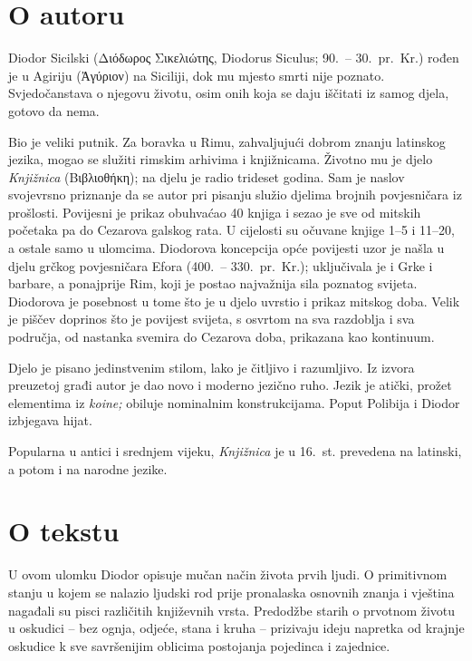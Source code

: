 \section*{O autoru}

Diodor Sicilski \textgreek[variant=ancient]{(Διόδωρος Σικελιώτης,} Diodorus Siculus; 90.\ – 30.\ pr.~Kr.) rođen je u Agiriju \textgreek[variant=ancient]{(Ἀγύριον)} na Siciliji, dok mu mjesto smrti nije poznato. Svjedočanstava o njegovu životu, osim onih koja se daju iščitati iz samog djela, gotovo da nema. 

Bio je veliki putnik. Za boravka u Rimu, zahvaljujući dobrom znanju latinskog jezika, mogao se služiti rimskim arhivima i knjižnicama. Životno mu je djelo \textit{Knjižnica} \textgreek[variant=ancient]{(Βιβλιοθήκη)}; na djelu je radio trideset godina. Sam je naslov svojevrsno priznanje da se autor pri pisanju služio djelima brojnih povjesničara iz prošlosti.  Povijesni je prikaz obuhvaćao 40 knjiga i sezao je sve od mitskih početaka pa do Cezarova galskog rata. U cijelosti su očuvane knjige 1–5 i 11–20, a ostale samo u ulomcima. Diodorova koncepcija opće povijesti uzor je našla u djelu grčkog povjesničara Efora (400.\ – 330.\ pr.~Kr.); uključivala je i Grke i barbare, a ponajprije Rim, koji je postao najvažnija sila poznatog svijeta. Diodorova je posebnost u tome što je u djelo uvrstio i prikaz mitskog doba. Velik je piščev doprinos što je povijest svijeta, s osvrtom na sva razdoblja i sva područja, od nastanka svemira do Cezarova doba, prikazana kao kontinuum.

Djelo je pisano jedinstvenim stilom, lako je čitljivo i razumljivo. Iz izvora preuzetoj građi autor je dao novo i moderno jezično ruho. Jezik je atički, prožet elementima iz \textit{koine;} obiluje nominalnim konstrukcijama. Poput Polibija i Diodor izbjegava hijat.

Popularna u antici i srednjem vijeku, \textit{Knjižnica} je u 16.~st. prevedena na latinski, a potom i na narodne jezike.

\section*{O tekstu}

U ovom ulomku Diodor opisuje mučan način života prvih ljudi. O primitivnom stanju u kojem se nalazio ljudski rod prije pronalaska osnovnih znanja i vještina nagađali su pisci različitih književnih vrsta. Predodžbe starih o prvotnom životu u oskudici – bez ognja, odjeće, stana i kruha – prizivaju ideju napretka od krajnje oskudice k sve savršenijim oblicima postojanja pojedinca i zajednice.

